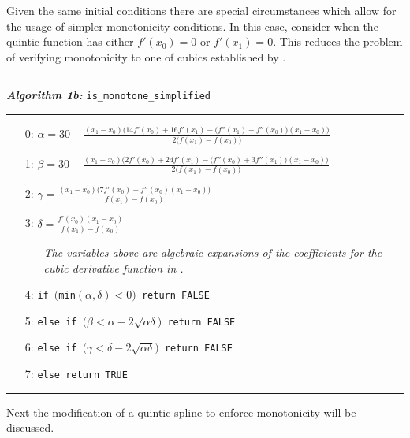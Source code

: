 \documentclass{article}
\begin{document}
Given the same initial conditions there are special circumstances which allow for the usage of simpler monotonicity conditions. In this case, consider when the quintic function has either $f'(x_0) = 0$ or $f'(x_1) = 0.$ This reduces the problem of verifying monotonicity to one of cubics established by \cite{schmidt1988positivity}.

\vspace{10pt}
\hrule
\vspace{3pt}
\noindent\textbf{\textit{Algorithm 1b:}} \texttt{is\_monotone\_simplified}
\vspace{3pt}
\hrule
\begin{itemize}
  \itemsep0pt
  \parskip0pt

\item[0:] $\alpha = 30 - \frac{(x_1 - x_0)\big( 14 f'(x_0) + 16 f'(x_1) - \big(f''(x_1) - f''(x_0) \big) (x_1 - x_0)\big)}{2\big(f(x_1) - f(x_0)\big)}$
\item[1:] $\beta = 30 - \frac{(x_1 - x_0)\big( 2 f'(x_0) + 24 f'(x_1) - \big(f''(x_0) + 3 f''(x_1) \big) (x_1 - x_0)\big)}{2\big(f(x_1) - f(x_0)\big)}$
\item[2:] $\gamma = \frac{(x_1 - x_0)\big( 7 f'(x_0) + f''(x_0) (x_1 - x_0) \big)}{f(x_1) - f(x_0)}$
\item[3:] $\delta = \frac{f'(x_0) (x_1 - x_0)}{f(x_1) - f(x_0)}$

  \begin{itemize}
    \item[] \textit{The variables above are algebraic expansions of the coefficients for the cubic derivative function in \cite{schmidt1988positivity}.}
  \end{itemize}

\item[4:] \texttt{if $\big($min$(\alpha, \delta) < 0\big)$ return FALSE}
\item[5:] \texttt{else if $\big(\beta < \alpha - 2 \sqrt{\alpha \delta}\big)$ return FALSE}
\item[6:] \texttt{else if $\big(\gamma < \delta - 2 \sqrt{\alpha \delta}\big)$ return FALSE}
\item[7:] \texttt{else return TRUE}

\end{itemize}
\hrule
\vspace{10pt}

Next the modification of a quintic spline to enforce monotonicity will be discussed.
\end{document}
